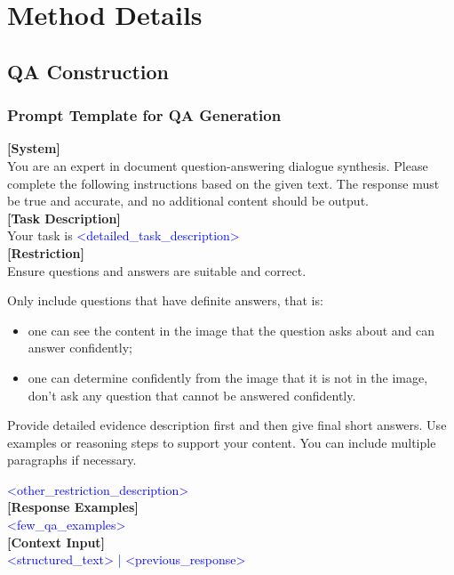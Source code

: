 \section{Method Details}
\label{xsec:method_details}

\subsection{QA Construction}
\label{xsubsec:details_of_qa_construction}

\subsubsection{Prompt Template for QA Generation}

\begin{tcolorbox}[colback=gray!5]
\small
\textbf{[System]}\\ 
You are an expert in document question-answering dialogue synthesis. Please complete the following instructions based on the given text. The response must be true and accurate, and no additional content should be output. \\

\textbf{[Task Description]}\\
Your task is \textcolor{blue}{<detailed\_task\_description>}\\

\textbf{[Restriction]} \\
Ensure questions and answers are suitable and correct.

Only include questions that have definite answers, that is:
\begin{itemize}[leftmargin=*]
    \item one can see the content in the image that the question asks about and can answer confidently;
    \item one can determine confidently from the image that it is not in the image, don't ask any question that cannot be answered confidently.
\end{itemize}

Provide detailed evidence description first and then give final short answers. Use examples or reasoning steps to support your content. You can include multiple paragraphs if necessary.

\textcolor{blue}{<other\_restriction\_description>} \\


\textbf{[Response Examples]}\\
\textcolor{blue}{<few\_qa\_examples>} \\

\textbf{[Context Input]}\\
\textcolor{blue}{<structured\_text> | <previous\_response>} \\

\label{text:prompt_template_qa_construction}
\end{tcolorbox}

